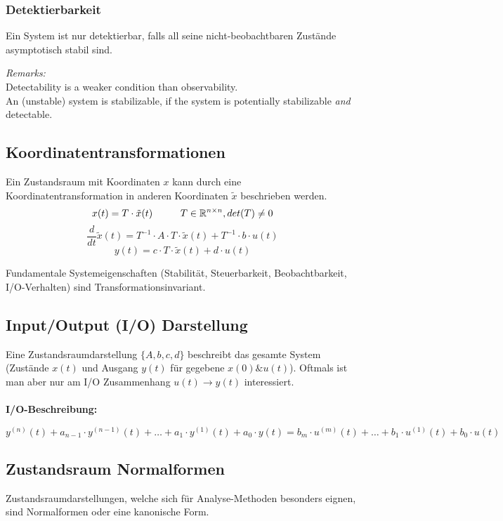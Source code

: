         \subsubsection{Detektierbarkeit}
           Ein System ist nur detektierbar, falls all seine nicht-beobachtbaren Zustände asymptotisch stabil sind.
           
           \textit{Remarks:}
           \\Detectability is a weaker condition than observability.
           \\An (unstable) system is stabilizable, if the system is potentially stabilizable \textit{and} detectable.
            
        \subsection{Koordinatentransformationen} Ein Zustandsraum mit Koordinaten $x$ kann durch eine Koordinatentransformation in anderen Koordinaten $\tilde{x}$ beschrieben werden.
        \[ x(t) = T \cdot \tilde{x}(t) \hspace{10mm} T \in\mathbb{R}^{n\times n}, det(T)\neq0\]
        \[\frac{d}{dt}\tilde{x}(t) = T^{-1} \cdot A\cdot T \cdot \tilde{x}(t) + T^{-1} \cdot b \cdot u(t)\]
        \[y(t) = c\cdot T \cdot \tilde{x}(t) + d \cdot u(t)\]
        
        Fundamentale Systemeigenschaften  (Stabilität, Steuerbarkeit, Beobachtbarkeit, I/O-Verhalten) sind Transformationsinvariant.
\vfill\null\columnbreak        
        \subsection{Input/Output (I/O) Darstellung}
            Eine Zustandsraumdarstellung $\{A,b,c,d\}$ beschreibt das gesamte System (Zustände $x(t)$ und Ausgang $y(t)$ für gegebene $x(0) \& u(t)$). Oftmals ist man aber nur am I/O Zusammenhang $u(t) \rightarrow y(t)$ interessiert.\\\\
            \textbf{I/O-Beschreibung:}
            \begin{center}
                $\displaystyle y^{(n)}(t)+a_{n-1}\cdot y^{(n-1)}(t)+\dots+a_1\cdot y^{(1)}(t)+a_0\cdot y(t) = b_m\cdot u^{(m)}(t)+\dots+b_1\cdot u^{(1)}(t)+b_0\cdot u(t)$
            \end{center}
            
        
        \subsection{Zustandsraum Normalformen}
            Zustandsraumdarstellungen, welche sich für Analyse-Methoden besonders eignen, sind Normalformen oder eine kanonische Form.
            
